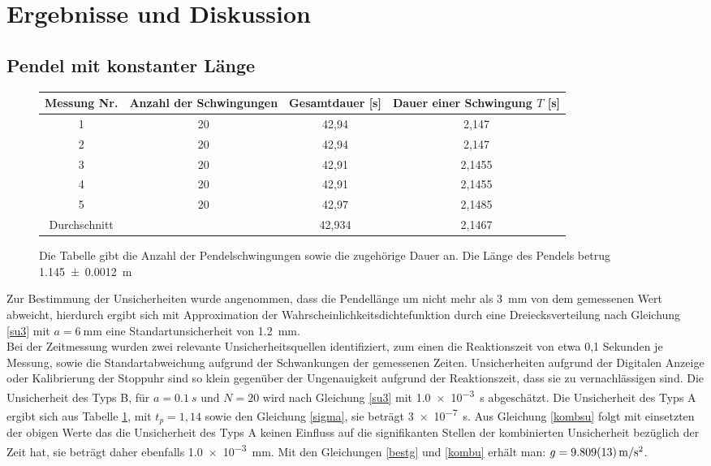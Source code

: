 

\section{Ergebnisse und Diskussion}


\subsection{Pendel mit konstanter Länge}


\begin{figure}[h]


\begin{tabular}{|c||c|c|c|}
\hline
Messung Nr. & Anzahl der Schwingungen & Gesamtdauer [s] & Dauer einer Schwingung $T$ [s] \\ \hline \hline
1&	20&	42,94&	2,147	\\ \hline
2&	20&	42,94&	2,147	\\ \hline
3&	20&	42,91&	2,1455	\\ \hline
4&	20&	42,91&	2,1455	\\	\hline
5&	20&	42,97&	2,1485	\\ \hline
Durchschnitt&&42,934&2,1467	\\ \hline


	
\end{tabular}
\caption{Die Tabelle gibt die Anzahl der Pendelschwingungen sowie die zugehörige Dauer an. Die Länge des Pendels betrug \SI{1,145+-0,0012} {\m}}
\label{lkonst}

\end{figure}

Zur Bestimmung der Unsicherheiten wurde angenommen, dass die Pendellänge um nicht mehr als \SI{3}{\mm} von dem gemessenen Wert abweicht, hierdurch ergibt sich mit Approximation der Wahrscheinlichkeitsdichtefunktion durch eine Dreiecksverteilung nach Gleichung \ref{su3} mit $a=\SI{6}{\mm}$ eine Standartunsicherheit von \SI{1,2}{mm}. \\


Bei der Zeitmessung wurden zwei relevante Unsicherheitsquellen identifiziert, zum einen die Reaktionszeit von etwa 0,1 Sekunden je Messung, sowie die Standartabweichung aufgrund der Schwankungen der gemessenen Zeiten. Unsicherheiten aufgrund der Digitalen Anzeige oder Kalibrierung der Stoppuhr sind so klein gegenüber der Ungenauigkeit aufgrund der Reaktionszeit, dass sie zu vernachlässigen sind.
 Die Unsicherheit des Typs B, für  $a=\SI{0,1}{s} $ und $N=20$ wird nach Gleichung \ref{su3} mit \SI{1,0e-3}{\s} abgeschätzt. Die Unsicherheit des Typs A ergibt sich aus Tabelle \ref{lkonst}, mit $t_p=1,14$ sowie den Gleichung \ref{sigma}, sie beträgt \SI{3e-7}{s}. Aus Gleichung \ref{kombsu} folgt mit einsetzten der obigen Werte das die Unsicherheit des Typs A keinen Einfluss  auf die signifikanten Stellen der kombinierten Unsicherheit bezüglich der Zeit hat, sie beträgt daher ebenfalls \SI{1,0e-3}{mm}.
Mit den Gleichungen \ref{bestg} und \ref{kombu} erhält man: $g=\SI{9,809+-0,013}{m/s^2}$.





